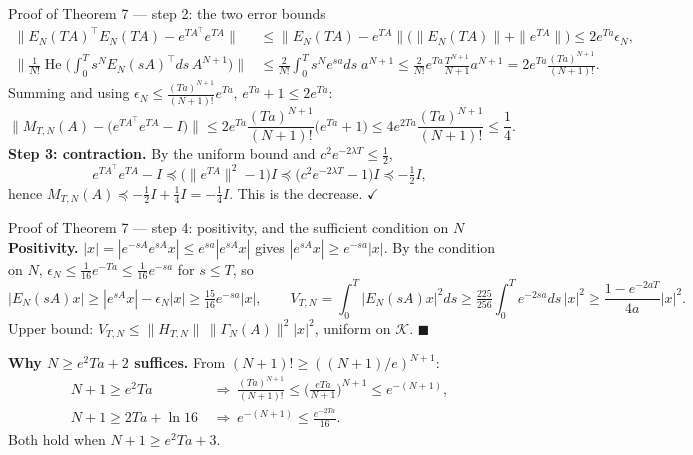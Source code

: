 \documentclass[10pt,aspectratio=169]{beamer}
\newcommand{\tr}{^{\top}}
\newcommand{\KK}{\mathcal{K}}
\DeclareMathOperator{\He}{He}
\begin{document}
\begin{frame}{Proof of Theorem 7 --- step 2: the two error bounds}
\begin{align*}
\|E_N(TA)\tr E_N(TA)-e^{TA\tr}e^{TA}\|&\le\|E_N(TA)-e^{TA}\|\big(\|E_N(TA)\|+\|e^{TA}\|\big)\le2e^{Ta}\epsilon_N,\\[1mm]
\Big\|\frac{1}{N!}\He\Big(\int_0^Ts^NE_N(sA)\tr ds\,A^{N+1}\Big)\Big\|&\le\frac{2}{N!}\int_0^Ts^Ne^{sa}ds\;a^{N+1}\le\frac{2}{N!}e^{Ta}\frac{T^{N+1}}{N+1}a^{N+1}=2e^{Ta}\frac{(Ta)^{N+1}}{(N+1)!}.
\end{align*}
Summing and using $\epsilon_N\le\frac{(Ta)^{N+1}}{(N+1)!}e^{Ta}$, $e^{Ta}+1\le2e^{Ta}$:
\[
\big\|M_{T,N}(A)-\big(e^{TA\tr}e^{TA}-I\big)\big\|\le2e^{Ta}\frac{(Ta)^{N+1}}{(N+1)!}\big(e^{Ta}+1\big)\le4e^{2Ta}\frac{(Ta)^{N+1}}{(N+1)!}\le\frac14 .
\]
\medskip
\textbf{Step 3: contraction.} By the uniform bound and $c^2e^{-2\lambda T}\le\frac12$,
\[
e^{TA\tr}e^{TA}-I\preceq\big(\|e^{TA}\|^2-1\big)I\preceq\big(c^2e^{-2\lambda T}-1\big)I\preceq-\tfrac12I ,
\]
hence $M_{T,N}(A)\preceq-\frac12I+\frac14I=-\frac14I$. This is the decrease. $\checkmark$
\end{frame}

\begin{frame}{Proof of Theorem 7 --- step 4: positivity, and the sufficient condition on $N$}
\small\textbf{Positivity.} $|x|=|e^{-sA}e^{sA}x|\le e^{sa}|e^{sA}x|$ gives $|e^{sA}x|\ge e^{-sa}|x|$. By the condition on $N$, $\epsilon_N\le\frac1{16}e^{-Ta}\le\frac1{16}e^{-sa}$ for $s\le T$, so
\[
|E_N(sA)x|\ge|e^{sA}x|-\epsilon_N|x|\ge\tfrac{15}{16}e^{-sa}|x|,\qquad
V_{T,N}=\int_0^T|E_N(sA)x|^2ds\ge\tfrac{225}{256}\int_0^Te^{-2sa}ds\,|x|^2\ge\frac{1-e^{-2aT}}{4a}|x|^2 .
\]
Upper bound: $V_{T,N}\le\|H_{T,N}\|\,\|\Gamma_N(A)\|^2|x|^2$, uniform on $\KK$. $\blacksquare$
\bigskip

\textbf{Why $N\ge e^2Ta+2$ suffices.} From $(N+1)!\ge((N+1)/e)^{N+1}$:
\begin{align*}
N+1\ge e^2Ta\ &\Rightarrow\ \frac{(Ta)^{N+1}}{(N+1)!}\le\Big(\frac{eTa}{N+1}\Big)^{N+1}\le e^{-(N+1)},\\
N+1\ge2Ta+\ln16\ &\Rightarrow\ e^{-(N+1)}\le\frac{e^{-2Ta}}{16}.
\end{align*}
Both hold when $N+1\ge e^2Ta+3$.
\end{frame}
\end{document}
